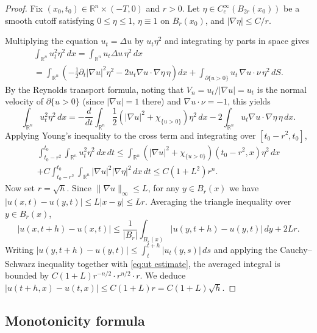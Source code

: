 \documentclass[11pt]{article}
\numberwithin{equation}{section}
\theoremstyle{definition}
\newcommand{\RR}{\mathbb{R}}
\begin{document}
\begin{proof}
Fix $(x_0,t_0)\in\RR^n\times(-T,0)$ and $r>0$. Let $\eta\in C_c^\infty(B_{2r}(x_0))$ be a smooth cutoff satisfying $0\leq\eta\leq 1$, $\eta\equiv 1$ on $B_r(x_0)$, and $|\nabla\eta|\leq C/r$.

Multiplying the equation $u_t=\Delta u$ by $u_t\eta^2$ and integrating by parts in space gives
    \begin{multline*}
    \int_{\RR^n} u_t^2 \eta^2\,dx = \int_{\RR^n} u_t\Delta u \,\eta^2 \,dx \\
    =\int_{\RR^n} \left(-\frac12 \partial_t|\nabla u|^2\eta^2 - 2 u_t \nabla u \cdot \nabla \eta\, \eta\right)dx + \int_{\partial \{u>0\}}u_t\, \nabla u\cdot \nu\, \eta^2\, dS.
    \end{multline*}
    By the Reynolds transport formula, noting that $V_n=u_t/|\nabla u|=u_t$ is the normal velocity of $\partial\{u>0\}$ (since $|\nabla u|=1$ there) and $\nabla u\cdot \nu=-1$, this yields
\begin{equation*}
    \int_{\RR^n} u_t^2 \eta^2\,dx=-\frac{d}{dt}\int_{\RR^n}\frac12(|\nabla u|^2+\chi_{\{u>0\}})\eta^2\,dx-2\int_{\RR^n}u_t \nabla u \cdot \nabla \eta\, \eta\, dx.
\end{equation*}
Applying Young's inequality to the cross term and integrating over $[t_0-r^2,t_0]$,
\begin{multline} \label{eq:ut estimate}
    \int_{t_0-r^2}^{t_0}\int_{\RR^n} u_t^2 \eta^2\,dx\,dt \leq \int_{\RR^n}(|\nabla u|^2+\chi_{\{u>0\}})(t_0-r^2,x)\eta^2 \,dx \\
    + C\int_{t_0-r^2}^{t_0}\int_{\RR^n}|\nabla u|^2 |\nabla \eta |^2 \,dx\,dt\leq C(1+L^2)r^n.
\end{multline}
Now set $r=\sqrt{h}$. Since $\|\nabla u\|_\infty\leq L$, for any $y\in B_r(x)$ we have $|u(x,t)-u(y,t)|\leq L|x-y|\leq Lr$. Averaging the triangle inequality over $y\in B_r(x)$,
\begin{equation*}
    |u(x,t+h)-u(x,t)|\leq \frac{1}{|B_r|} \int_{B_{r}(x)}|u(y,t+h)-u(y,t)|\,dy+ 2Lr.
\end{equation*}
Writing $|u(y,t+h)-u(y,t)|\leq\int_t^{t+h}|u_t(y,s)|\,ds$ and applying the Cauchy--Schwarz inequality together with \eqref{eq:ut estimate}, the averaged integral is bounded by $C(1+L)r^{-n/2}\cdot r^{n/2}\cdot r$. We deduce $|u(t+h,x)-u(t,x)|\leq C(1+L)r=C(1+L)\sqrt{h}$.
\end{proof}

\subsection{Monotonicity formula}
\end{document}
